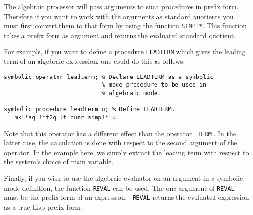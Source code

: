 The algebraic processor will pass arguments to such procedures in prefix
form. Therefore if you want to work with the arguments as standard
quotients you must first convert them to that form by using the function
{\tt SIMP!*}. This function takes a prefix form as argument and returns the
evaluated standard quotient.

For example, if you want to define a procedure {\tt LEADTERM} which gives the
leading term of an algebraic expression, one could do this as follows:
\begin{samepage}
\begin{verbatim}
symbolic operator leadterm; % Declare LEADTERM as a symbolic
                            % mode procedure to be used in
                            % algebraic mode.

symbolic procedure leadterm u; % Define LEADTERM.
   mk!*sq !*t2q lt numr simp!* u;
\end{verbatim}
\end{samepage}
Note that this operator has a different effect than the operator {\tt LTERM}
.  In the latter case, the calculation is done
with respect to the second argument of the operator.  In the example here,
we simply extract the leading term with respect to the system's choice of
main variable.

Finally, if you wish to use the algebraic evaluator on an argument in a
symbolic mode definition, the function {\tt REVAL} can be used.  The one
argument of {\tt REVAL} must be the prefix form of an expression. {\tt
REVAL} returns the evaluated expression as a true Lisp prefix form.

